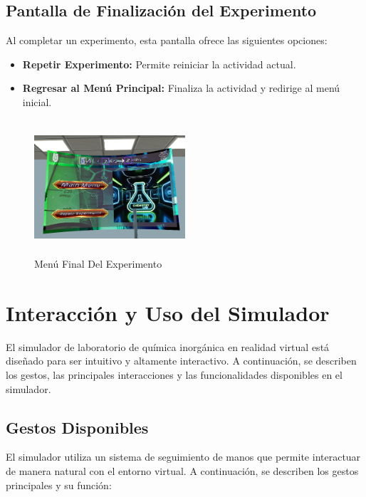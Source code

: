 \subsection{Pantalla de Finalización del Experimento}
Al completar un experimento, esta pantalla ofrece las siguientes opciones:
\begin{itemize}
    \item \textbf{Repetir Experimento:} Permite reiniciar la actividad actual.
    \item \textbf{Regresar al Menú Principal:} Finaliza la actividad y redirige al menú inicial.
\end{itemize}
\begin{figure}[thbp]
    \centering
    \includegraphics[width=0.5\textwidth, height = 5cm]{img/GUI/UI_Final.png}
    \caption{Menú Final Del Experimento}
    \label{fig:Menú_Final_Del_Experimento}
\end{figure}
\section{Interacción y Uso del Simulador}

El simulador de laboratorio de química inorgánica en realidad virtual está diseñado para ser intuitivo y altamente interactivo. A continuación, se describen los gestos, las principales interacciones y las funcionalidades disponibles en el simulador.

\subsection{Gestos Disponibles}

El simulador utiliza un sistema de seguimiento de manos que permite interactuar de manera natural con el entorno virtual. A continuación, se describen los gestos principales y su función:

